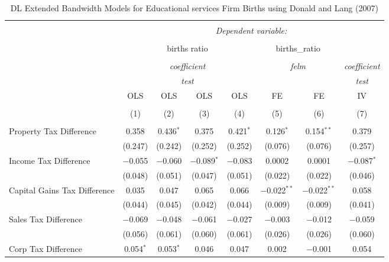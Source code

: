 
\begin{table}[!htbp] \centering 
  \caption{DL Extended Bandwidth Models for  Educational services Firm Births using Donald and Lang (2007)} 
  \label{} 
\begin{tabular}{@{\extracolsep{5pt}}lccccccc} 
\\[-1.8ex]\hline 
\hline \\[-1.8ex] 
 & \multicolumn{7}{c}{\textit{Dependent variable:}} \\ 
\cline{2-8} 
\\[-1.8ex] & \multicolumn{4}{c}{births ratio} & \multicolumn{2}{c}{births\_ratio} &   \\ 
\\[-1.8ex] & \multicolumn{4}{c}{\textit{coefficient}} & \multicolumn{2}{c}{\textit{felm}} & \textit{coefficient} \\ 
 & \multicolumn{4}{c}{\textit{test}} & \multicolumn{2}{c}{\textit{}} & \textit{test} \\ 
 & OLS & OLS & OLS & OLS & FE & FE & IV \\ 
\\[-1.8ex] & (1) & (2) & (3) & (4) & (5) & (6) & (7)\\ 
\hline \\[-1.8ex] 
 Property Tax Difference & 0.358 & 0.436$^{*}$ & 0.375 & 0.421$^{*}$ & 0.126$^{*}$ & 0.154$^{**}$ & 0.379 \\ 
  & (0.247) & (0.242) & (0.252) & (0.252) & (0.076) & (0.076) & (0.257) \\ 
  Income Tax Difference & $-$0.055 & $-$0.060 & $-$0.089$^{*}$ & $-$0.083 & 0.0002 & 0.0001 & $-$0.087$^{*}$ \\ 
  & (0.048) & (0.051) & (0.047) & (0.051) & (0.022) & (0.022) & (0.046) \\ 
  Capital Gains Tax Difference & 0.035 & 0.047 & 0.065 & 0.066 & $-$0.022$^{**}$ & $-$0.022$^{**}$ & 0.058 \\ 
  & (0.044) & (0.045) & (0.042) & (0.044) & (0.009) & (0.009) & (0.041) \\ 
  Sales Tax Difference & $-$0.069 & $-$0.048 & $-$0.061 & $-$0.027 & $-$0.003 & $-$0.012 & $-$0.059 \\ 
  & (0.056) & (0.061) & (0.060) & (0.061) & (0.026) & (0.026) & (0.060) \\ 
  Corp Tax Difference & 0.054$^{*}$ & 0.053$^{*}$ & 0.046 & 0.047 & 0.002 & $-$0.001 & 0.054 \\ 

\end{tabular}
\end{table}
